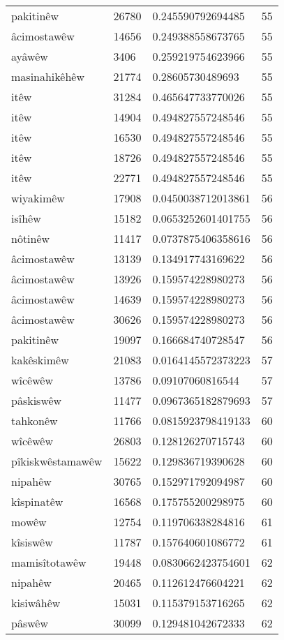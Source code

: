 \begin{longtable}{llll}
pakitinêw & 26780 & 0.245590792694485 & 55\\
âcimostawêw & 14656 & 0.249388558673765 & 55\\
ayâwêw & 3406 & 0.259219754623966 & 55\\
masinahikêhêw & 21774 & 0.28605730489693 & 55\\
itêw & 31284 & 0.465647733770026 & 55\\
itêw & 14904 & 0.494827557248546 & 55\\
itêw & 16530 & 0.494827557248546 & 55\\
itêw & 18726 & 0.494827557248546 & 55\\
itêw & 22771 & 0.494827557248546 & 55\\
wiyakimêw & 17908 & 0.0450038712013861 & 56\\
isîhêw & 15182 & 0.0653252601401755 & 56\\
nôtinêw & 11417 & 0.0737875406358616 & 56\\
âcimostawêw & 13139 & 0.134917743169622 & 56\\
âcimostawêw & 13926 & 0.159574228980273 & 56\\
âcimostawêw & 14639 & 0.159574228980273 & 56\\
âcimostawêw & 30626 & 0.159574228980273 & 56\\
pakitinêw & 19097 & 0.166684740728547 & 56\\
kakêskimêw & 21083 & 0.0164145572373223 & 57\\
wîcêwêw & 13786 & 0.09107060816544 & 57\\
pâskiswêw & 11477 & 0.0967365182879693 & 57\\
tahkonêw & 11766 & 0.0815923798419133 & 60\\
wîcêwêw & 26803 & 0.128126270715743 & 60\\
pîkiskwêstamawêw & 15622 & 0.129836719390628 & 60\\
nipahêw & 30765 & 0.152971792094987 & 60\\
kîspinatêw & 16568 & 0.175755200298975 & 60\\
mowêw & 12754 & 0.119706338284816 & 61\\
kîsiswêw & 11787 & 0.157640601086772 & 61\\
mamisîtotawêw & 19448 & 0.0830662423754601 & 62\\
nipahêw & 20465 & 0.112612476604221 & 62\\
kisiwâhêw & 15031 & 0.115379153716265 & 62\\
pâswêw & 30099 & 0.129481042672333 & 62\\

\end{longtable}
